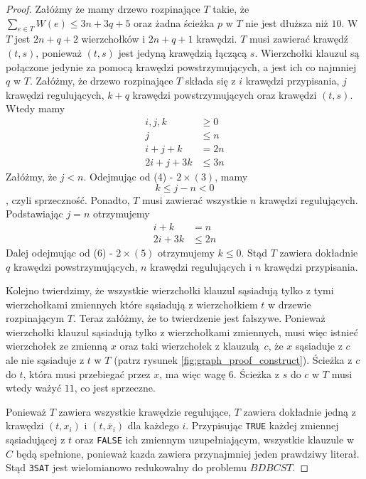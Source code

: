\begin{theorem}
\begin{proof}
        Załóżmy że mamy drzewo rozpinające $T$ takie, że $\sum_{e\in T} W(e) \leq 3n +3q + 5$ oraz żadna ścieżka $p$ w $T$ nie jest dłuższa niż $10$. W $T$ jest $2n + q + 2$ wierzchołków i $2n + q + 1$ krawędzi. $T$ musi zawierać krawędź $(t, s)$, ponieważ $(t, s)$ jest jedyną krawędzią łączącą $s$. Wierzchołki klauzul są połączone jedynie za pomocą krawędzi powstrzymujących, a jest ich co najmniej $q$ w $T$. Załóżmy, że drzewo rozpinające $T$ składa się z $i$ krawędzi przypisania, $j$ krawędzi regulujących, $k + q$ krawędzi powstrzymujących oraz krawędzi $(t, s)$. Wtedy mamy
        \begin{align}
            i, j, k     &\geq 0 \\
            j           &\leq n \\
            i + j + k   &= 2n \\
            2i + j + 3k &\leq 3n 
        \end{align}
        Załóżmy, że $j < n$. Odejmując od (4) - $2\times (3)$, mamy $$k \leq j-n < 0$$, czyli sprzeczność. Ponadto, $T$ musi zawierać wszystkie $n$ krawędzi regulujących. Podstawiając $j = n$ otrzymujemy
        \begin{align}
            i + k   &= n \\
            2i + 3k &\leq 2n
        \end{align}
        Dalej odejmując od (6) - $2\times (5)$ otrzymujemy $k \leq 0$. Stąd $T$ zawiera dokładnie $q$ krawędzi powstrzymujących, $n$ krawędzi regulujących i $n$ krawędzi przypisania.

        Kolejno twierdzimy, że wszystkie wierzchołki klauzul sąsiadują tylko z tymi wierzchołkami zmiennych które sąsiadują z wierzchołkiem $t$ w drzewie rozpinającym $T$. Teraz załóżmy, że to twierdzenie jest fałszywe. Ponieważ wierzchołki klauzul sąsiadują tylko z wierzchołkami zmiennych, musi więc istnieć wierzchołek ze zmienną $x$ oraz taki wierzchołek z klauzulą $c$, że $x$ sąsiaduje z $c$ ale nie sąsiaduje z $t$ w $T$ (patrz rysunek \ref{fig:graph_proof_construct}). Ścieżka z $c$ do $t$, która musi przebiegać przez $x$, ma więc wagę $6$. Ścieżka z $s$ do $c$ w $T$ musi wtedy ważyć $11$, co jest sprzeczne.

        Ponieważ $T$ zawiera wszystkie krawędzie regulujące, $T$ zawiera dokładnie jedną z krawędzi $(t, x_i)$ i $(t, \bar{x}_i)$ dla każdego $i$. Przypisując \texttt{TRUE} każdej zmiennej sąsiadującej z $t$ oraz \texttt{FALSE} ich zmiennym uzupełniającym, wszystkie klauzule w $C$ będą spełnione, ponieważ kazda zawiera przynajmniej jeden prawdziwy literał. Stąd \texttt{3SAT} jest wielomianowo redukowalny do problemu $BDBCST$. 
    \end{proof}
\end{theorem}

